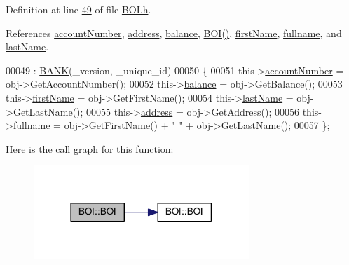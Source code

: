 Definition at line \hyperlink{_b_o_i_8h_source_l00049}{49} of file \hyperlink{_b_o_i_8h_source}{B\+O\+I.\+h}.



References \hyperlink{_b_o_i_8h_source_l00099}{account\+Number}, \hyperlink{_b_o_i_8h_source_l00101}{address}, \hyperlink{_b_o_i_8h_source_l00100}{balance}, \hyperlink{_b_o_i_8h_source_l00024}{B\+O\+I()}, \hyperlink{_b_o_i_8h_source_l00097}{first\+Name}, \hyperlink{_b_o_i_8h_source_l00096}{fullname}, and \hyperlink{_b_o_i_8h_source_l00098}{last\+Name}.


\begin{DoxyCode}
00049                                                              : \hyperlink{class_b_a_n_k_a0bc938356cebff14fb0560264abe5a34_a0bc938356cebff14fb0560264abe5a34}{BANK}(\_version, \_unique\_id)
00050     \{
00051         this->\hyperlink{class_b_o_i_a35c9fd6e938eb44ad4e076bc6a736851_a35c9fd6e938eb44ad4e076bc6a736851}{accountNumber} = obj->GetAccountNumber();
00052         this->\hyperlink{class_b_o_i_aa00a3d8baf3420647c40119b7fa4ed6f_aa00a3d8baf3420647c40119b7fa4ed6f}{balance} = obj->GetBalance();
00053         this->\hyperlink{class_b_o_i_a12872fd8c15dbf833f78862b00579ed1_a12872fd8c15dbf833f78862b00579ed1}{firstName} = obj->GetFirstName();
00054         this->\hyperlink{class_b_o_i_ad51bfa6f28816c7f5036447ff809cecf_ad51bfa6f28816c7f5036447ff809cecf}{lastName} = obj->GetLastName();
00055         this->\hyperlink{class_b_o_i_ab9315fe76fd9f07551f5ae7899d33516_ab9315fe76fd9f07551f5ae7899d33516}{address} = obj->GetAddress();
00056         this->\hyperlink{class_b_o_i_a6d7c892a54bb6f7327cdc777081ab5f4_a6d7c892a54bb6f7327cdc777081ab5f4}{fullname} = obj->GetFirstName() + \textcolor{stringliteral}{" "} + obj->GetLastName(); 
00057     \};
\end{DoxyCode}


Here is the call graph for this function\+:
\nopagebreak
\begin{figure}[H]
\begin{center}
\leavevmode
\includegraphics[width=230pt]{class_b_o_i_ae4263940f8ffdd40d5f01a714b20f791_ae4263940f8ffdd40d5f01a714b20f791_cgraph}
\end{center}
\end{figure}


